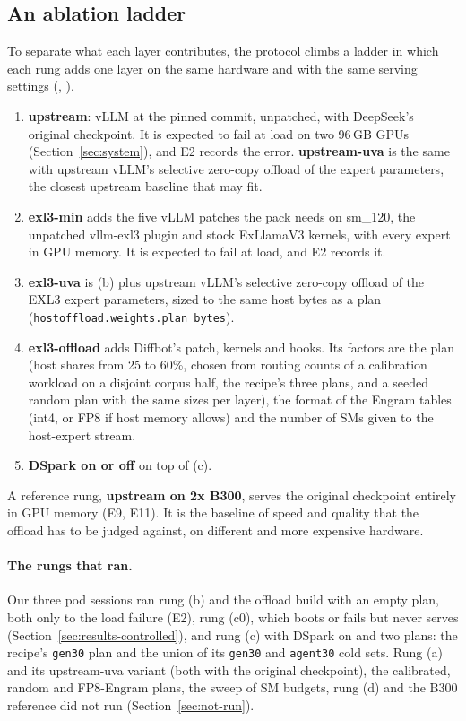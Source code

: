 \subsection{An ablation ladder}
To separate what each layer contributes, the protocol climbs a ladder in which each rung adds one layer on the same
hardware and with the same serving settings (, ).
\begin{enumerate}
\item[(a)] \textbf{upstream}: vLLM at the pinned commit, unpatched, with DeepSeek's original checkpoint. It is expected
to fail at load on two 96\,GB GPUs (Section~\ref{sec:system}), and E2 records the error. \textbf{upstream-uva} is the
same with upstream vLLM's selective zero-copy offload of the expert parameters, the closest upstream baseline that
may fit.
\item[(b)] \textbf{exl3-min} adds the five vLLM patches the pack needs on sm\_120, the unpatched vllm-exl3 plugin and
stock ExLlamaV3 kernels, with every expert in GPU memory. It is expected to fail at load, and E2 records it.
\item[(c0)] \textbf{exl3-uva} is (b) plus upstream vLLM's selective zero-copy offload of the EXL3 expert parameters,
sized to the same host bytes as a plan (\texttt{hostoffload.weights.plan bytes}).
\item[(c)] \textbf{exl3-offload} adds Diffbot's patch, kernels and hooks. Its factors are the plan (host shares from
25 to 60\%, chosen from routing counts of a calibration workload on a disjoint corpus half, the recipe's three plans,
and a seeded random plan with the same sizes per layer), the format of the Engram tables (int4, or FP8 if host memory
allows) and the number of SMs given to the host-expert stream.
\item[(d)] \textbf{DSpark on or off} on top of (c).
\end{enumerate}
A reference rung, \textbf{upstream on 2x B300}, serves the original checkpoint entirely in GPU memory (E9, E11). It is
the baseline of speed and quality that the offload has to be judged against, on different and more expensive
hardware.

\paragraph{The rungs that ran.} Our three pod sessions ran rung (b) and the offload build with an empty plan, both only
to the load failure (E2), rung (c0), which boots or fails but never serves (Section~\ref{sec:results-controlled}), and
rung (c) with DSpark on and two plans: the recipe's \texttt{gen30} plan and the union of its \texttt{gen30} and
\texttt{agent30} cold sets. Rung (a) and its upstream-uva variant (both with the original checkpoint), the calibrated,
random and FP8-Engram plans, the sweep of SM budgets, rung (d) and the B300 reference did not run
(Section~\ref{sec:not-run}).

